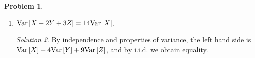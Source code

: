 \documentclass[11pt]{article}
\theoremstyle{definition}
\newtheorem{prob}[theo]{\color{Maroon} Problem}
\theoremstyle{remark}
\newtheorem*{soln}{\color{Maroon} Solution}
\renewcommand{\var}[1]{\textnormal{Var}\left[ #1 \right]}
\begin{document}
\begin{prob}
\begin{enumerate}[label = (\alph*)]
    \begin{soln}
    The latter has zero variance.
    \end{soln}
    
    \dotfill
    
    \item $\var{X - 2Y + 3Z} = 14\var{X}$.
    
    \begin{soln} By independence and properties of variance, the left hand side is $\var{X} + 4\var{Y} + 9\var{Z}$, and by i.i.d. we obtain equality.
    \end{soln}
    
\end{enumerate}

\end{prob}

\pagebreak
\end{document}
